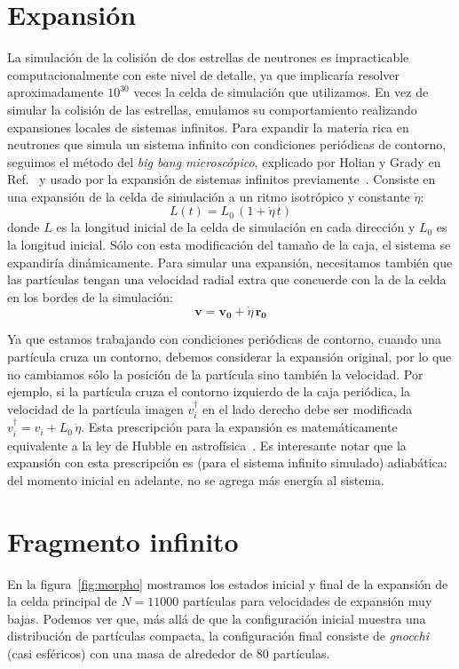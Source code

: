 \section{Expansión}\label{sc:expansion}
La simulación de la colisión de dos estrellas de neutrones es impracticable computacionalmente con este nivel de detalle, ya que implicaría resolver aproximadamente $10^{30}$ veces la celda de simulación que utilizamos.
En vez de simular la colisión de las estrellas, emulamos su comportamiento realizando expansiones locales de sistemas infinitos.
Para expandir la materia rica en neutrones que simula un sistema infinito con condiciones periódicas de contorno, seguimos el método del \emph{big bang microscópico}, explicado por Holian y Grady en Ref.~\cite{holian_fragmentation_1988} y usado por la expansión de sistemas infinitos previamente~\cite{dorso_onset_1996}.
Consiste en una expansión de la celda de simulación a un ritmo isotrópico y constante $\dot{\eta}$:
\begin{equation}
  L(t) = L_0\,(1+\dot{\eta}\,t)
\end{equation}
donde $L$ es la longitud inicial de la celda de simulación en cada dirección y $L_0$ es la longitud inicial.
Sólo con esta modificación del tamaño de la caja, el sistema se expandiría dinámicamente.
Para simular una expansión, necesitamos también que las partículas tengan una velocidad radial extra que concuerde con la de la celda en los bordes de la simulación:
\begin{equation}
  \mathbf{v} = \mathbf{v_0} + \dot{\eta}\,\mathbf{r_0}
\end{equation}

Ya que estamos trabajando con condiciones periódicas de contorno, cuando una partícula cruza un contorno, debemos considerar la expansión original, por lo que no cambiamos sólo la posición de la partícula sino también la velocidad.
Por ejemplo, si la partícula cruza el contorno izquierdo de la caja periódica, la velocidad de la partícula imagen $v_i^\dagger$ en el lado derecho debe ser modificada $v_i^\dagger = v_i + L_0\,\dot{\eta}$.
Esta prescripción para la expansión es matemáticamente equivalente a la ley de Hubble en astrofísica~\cite{chikazumi_quantum_2001}.
Es interesante notar que la expansión con esta prescripción es (para el sistema infinito simulado) adiabática: del momento inicial en adelante, no se agrega más energía al sistema.

\section{Fragmento infinito}
En la figura~\ref{fig:morpho} mostramos los estados inicial y final de la expansión de la celda principal de $N=11000$ partículas para velocidades de expansión muy bajas.
Podemos ver que, más allá de que la configuración inicial muestra una distribución de partículas compacta, la configuración final consiste de \emph{gnocchi} (casi esféricos) con una masa de alrededor de 80 partículas.

